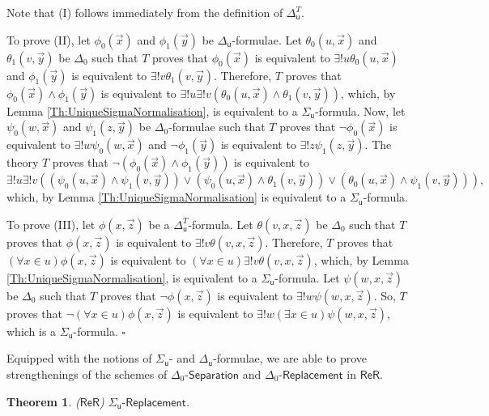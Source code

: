 \documentclass[11pt, a4paper]{article}
\newcounter{Theor1}
\newtheorem{theorem}{Theorem}[section]
\newenvironment{proof}[1][Proof]{\begin{trivlist}
\item[\hskip \labelsep {\bfseries #1}]}{\end{trivlist}}
\begin{document}
\begin{proof}
Note that (I) follows immediately from the definition of $\Delta_{\mathsf{u}}^T$. 

To prove (II), let $\phi_0(\vec{x})$ and $\phi_1(\vec{y})$ be $\Delta_{\mathsf{u}}$-formulae. Let $\theta_0(u, \vec{x})$ and $\theta_1(v, \vec{y})$ be $\Delta_0$ such that
$T$ proves that $\phi_0(\vec{x})$ is equivalent to $\exists! u \theta_0(u, \vec{x})$ and $\phi_1(\vec{y})$ is equivalent to $\exists! v \theta_1(v, \vec{y})$. Therefore, $T$ proves that $\phi_0(\vec{x})\land \phi_1(\vec{y})$ is equivalent to $\exists!u \exists! v(\theta_0(u, \vec{x}) \land \theta_1(v, \vec{y}))$, which, by Lemma \ref{Th:UniqueSigmaNormalisation}, is equivalent to a $\Sigma_{\mathsf{u}}$-formula. Now, let $\psi_0(w, \vec{x})$ and $\psi_1(z, \vec{y})$ be $\Delta_0$-formulae such that $T$ proves that $\neg \phi_0(\vec{x})$ is equivalent to $\exists! w \psi_0(w, \vec{x})$ and $\neg \phi_1(\vec{y})$ is equivalent to $\exists! z \psi_1(z, \vec{y})$. The theory $T$ proves that $\neg(\phi_0(\vec{x}) \land \phi_1(\vec{y}))$ is equivalent to
\[
\exists! u \exists! v ((\psi_0(u, \vec{x}) \land \psi_1(v, \vec{y})) \lor (\psi_0(u, \vec{x}) \land \theta_1(v, \vec{y})) \lor (\theta_0(u, \vec{x}) \land \psi_1(v, \vec{y}))),
\]
which, by Lemma \ref{Th:UniqueSigmaNormalisation} is equivalent to a $\Sigma_{\mathsf{u}}$-formula.

To prove (III), let $\phi(x, \vec{z})$ be a $\Delta_{\mathsf{u}}^T$-formula. Let $\theta(v, x, \vec{z})$ be $\Delta_0$ such that $T$ proves that $\phi(x, \vec{z})$ is equivalent to $\exists! v \theta(v, x, \vec{z})$. Therefore, $T$ proves that $(\forall x \in u)\phi(x, \vec{z})$ is equivalent to $(\forall x \in u) \exists! v \theta(v, x, \vec{z})$, which, by Lemma \ref{Th:UniqueSigmaNormalisation}, is equivalent to a $\Sigma_{\mathsf{u}}$-formula. Let $\psi(w, x, \vec{z})$ be $\Delta_0$ such that $T$ proves that $\neg \phi(x, \vec{z})$ is equivalent to $\exists! w \psi(w, x, \vec{z})$. So, $T$ proves that $\neg (\forall x \in u) \phi(x, \vec{z})$ is equivalent to $\exists! w (\exists x \in u) \psi(w, x, \vec{z})$, which is a $\Sigma_{\mathsf{u}}$-formula. \hfill$\square$        
\end{proof}

Equipped with the notions of $\Sigma_{\mathsf{u}}$- and $\Delta_{\mathsf{u}}$-formulae, we are able to prove strengthenings of the schemes of $\Delta_0\textsf{-Separation}$ and $\Delta_0\textsf{-Replacement}$ in $\mathsf{ReR}$.

\begin{theorem}
($\mathsf{ReR}$) $\Sigma_{\mathsf{u}}\textsf{-Replacement}$.
\end{theorem}
\end{document}
